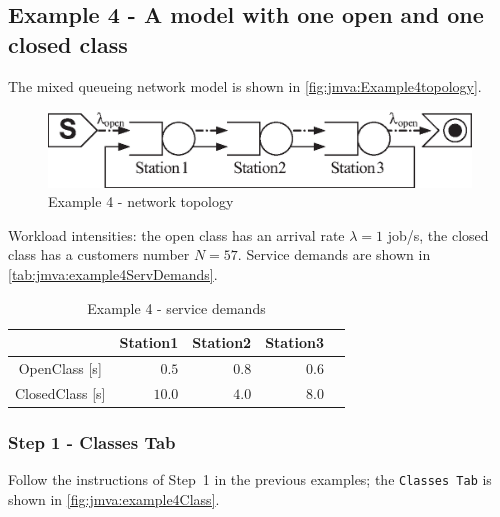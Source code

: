 \subsection{Example 4 - A model with one open and one closed class}
\label{sec:jmva:example4}

The mixed queueing network model is shown in
\autoref{fig:jmva:Example4topology}.
\begin{figure}[htbp]
    \begin{center}
        \includegraphics[scale=.65]{img/jmva/example4}
    \end{center}
    \caption{Example 4 - network topology}
    \label{fig:jmva:Example4topology}
\end{figure}
Workload intensities: the open class has an arrival rate $\lambda =
1$ job/s, the closed class has a customers number $N = 57$. Service
demands are shown in \autoref{tab:jmva:example4ServDemands}.

\begin{table}[htbp]
\begin{center}
\begin{tabular}{c|r|r|r|r|}
& \multicolumn{1}{c|}{Station1} & \multicolumn{1}{c|}{Station2} & \multicolumn{1}{c|}{Station3} \\
\hline
OpenClass [s]& $0.5$ & $0.8$ & $0.6$ \\
ClosedClass [s]& $10.0$ & $4.0$ & $8.0$ \\
\hline
\end{tabular}
\end{center}
\caption{Example 4 - service demands}
\label{tab:jmva:example4ServDemands}
\end{table}

\subsubsection{Step 1 - Classes Tab}

Follow the instructions of Step~1 in the previous examples; the
\texttt{Classes Tab} is shown in \autoref{fig:jmva:example4Class}.

